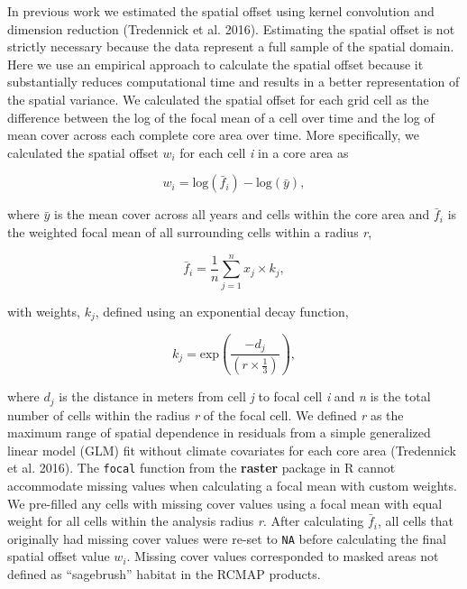 \documentclass[
  12pt,
]{article}
\begin{document}
In previous work we estimated the spatial offset using kernel convolution and dimension reduction (Tredennick et al. 2016).
Estimating the spatial offset is not strictly necessary because the data represent a full sample of the spatial domain.
Here we use an empirical approach to calculate the spatial offset because it substantially reduces computational time and results in a better representation of the spatial variance.
We calculated the spatial offset for each grid cell as the difference between the log of the focal mean of a cell over time and the log of mean cover across each complete core area over time. More specifically, we calculated the spatial offset \(w_i\) for each cell \emph{i} in a core area as

\begin{equation}
w_{i} = {\text{log}(\bar{f}_{i}) - \text{log}(\bar{y})},
\end{equation}

\noindent{}where \(\bar{y}\) is the mean cover across all years and cells within the core area and \(\bar{f}_{i}\) is the weighted focal mean of all surrounding cells within a radius \emph{r},

\begin{equation}
\bar{f}_{i} = \frac{1}{n} \sum_{j=1}^{n}x_{j} \times k_{j},
\end{equation}

\noindent{}with weights, \(k_{j}\), defined using an exponential decay function,

\begin{equation}
k_{j} = \text{exp}\left( \frac{-d_{j} }{\left(r\times\frac{1}{3} \right)} \right),
\end{equation}

\noindent{}where \(d_j\) is the distance in meters from cell \emph{j} to focal cell \emph{i} and \emph{n} is the total number of cells within the radius \emph{r} of the focal cell.
We defined \emph{r} as the maximum range of spatial dependence in residuals from a simple generalized linear model (GLM) fit without climate covariates for each core area (Tredennick et al. 2016).
The \texttt{focal} function from the \textbf{raster} package in R cannot accommodate missing values when calculating a focal mean with custom weights.
We pre-filled any cells with missing cover values using a focal mean with equal weight for all cells within the analysis radius \emph{r}.
After calculating \(\bar{f}_{i}\), all cells that originally had missing cover values were re-set to \texttt{NA} before calculating the final spatial offset value \(w_i\).
Missing cover values corresponded to masked areas not defined as ``sagebrush'' habitat in the RCMAP products.
\end{document}
